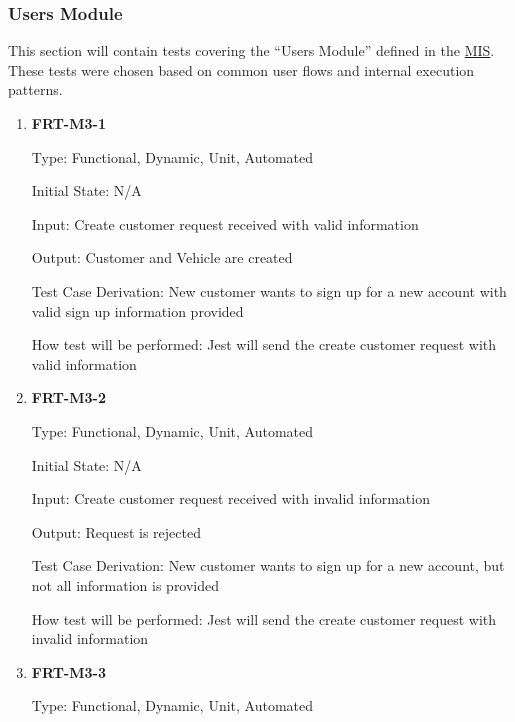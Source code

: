 \documentclass[12pt, titlepage]{article}
\begin{document}
\subsubsection{Users Module}


This section will contain tests covering the ``Users Module'' defined in the
\href{https://github.com/arkinmodi/project-sayyara/blob/main/docs/Design/SoftDetailedDes/MIS.pdf}{MIS}.
These tests were chosen based on common user flows and internal execution patterns.

\begin{enumerate}

	\item \textbf{FRT-M3-1}

	      Type: Functional, Dynamic, Unit, Automated

	      Initial State: N/A

	      Input: Create customer request received with valid information

	      Output: Customer and Vehicle are created

	      Test Case Derivation: New customer wants to sign up for a new account with valid sign up
	      information provided

	      How test will be performed: Jest will send the create customer request with valid information

	\item \textbf{FRT-M3-2}

	      Type: Functional, Dynamic, Unit, Automated

	      Initial State: N/A

	      Input: Create customer request received with invalid information

	      Output: Request is rejected

	      Test Case Derivation: New customer wants to sign up for a new account, but not all information is
	      provided

	      How test will be performed: Jest will send the create customer request with invalid information

	\item \textbf{FRT-M3-3}

	      Type: Functional, Dynamic, Unit, Automated


\end{enumerate}
\end{document}
